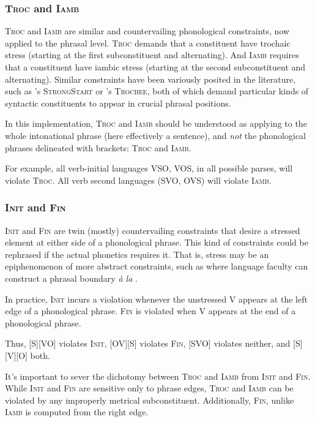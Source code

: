\documentclass{article}
\newcommand{\iamb}{\textsc{Iamb}}
\newcommand{\finphi}{\textsc{Fin\textphi}}
\newcommand{\initphi}{\textsc{Init\textphi}}
\newcommand{\troc}{\textsc{Troc}}
\begin{document}
\subsubsection{{\troc} and {\iamb}}

{\troc} and {\iamb} are similar and countervailing phonological constraints, now applied to the phrasal level.
{\troc} demands that a constituent have trochaic stress (starting at the first subconstituent and alternating).
And {\iamb} requires that a constituent have iambic stress (starting at the second subconstituent and alternating).
Similar constraints have been variously posited in the literature, such as \textcite{selkirk11}'s \textsc{StrongStart} or \textcite{fitzgerald94}'s \textsc{Trochee}, both of which demand particular kinds of syntactic constituents to appear in crucial phrasal positions.

In this implementation, {\troc} and {\iamb} should be understood as applying to the whole intonational phrase (here effectively a sentence), and \emph{not} the phonological phrases delineated with brackets: {\troc} and {\iamb}.

For example, all verb-initial languages VSO, VOS, in all possible parses, will violate {\troc}.
All verb second languages (SVO, OVS) will violate {\iamb}.

\subsubsection{{\initphi} and {\finphi}}

{\initphi} and {\finphi} are twin (mostly) countervailing constraints that desire a stressed element at either side of a phonological phrase.
This kind of constraints could be rephrased if the actual phonetics requires it.
That is, stress may be an epiphenomenon of more abstract constraints, such as where language faculty can construct a phrasal boundary \textit{\`a la} \textcite{richards10}.

In practice, {\initphi} incurs a violation whenever the unstressed V appears at the left edge of a phonological phrase.
{\finphi} is violated when V appears at the end of a phonological phrase.

Thus, [S][VO] violates {\initphi}, [OV][S] violates {\finphi}, [SVO] violates neither, and [S][V][O] both.

It's important to sever the dichotomy between {\troc} and {\iamb} from {\initphi} and {\finphi}. While {\initphi} and {\finphi} are sensitive only to phrase edges, {\troc} and {\iamb} can be violated by any improperly metrical subconstituent. Additionally, {\finphi}, unlike {\iamb} is computed from the right edge.
\end{document}
